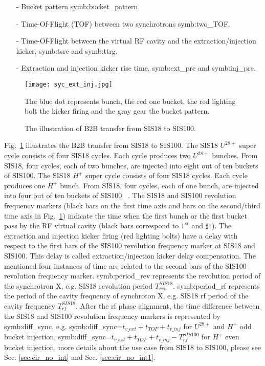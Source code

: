 \begin{itemize}
\item[-] Bucket pattern \gls{symb:bucket_pattern}.
\item[-] Time-Of-Flight (\gls{TOF}) between two synchrotrons \gls{symb:two_TOF}. 
\item[-] Time-Of-Flight between the virtual RF cavity and the extraction/injection kicker, \gls{symb:tsrc} and \gls{symb:ttrg}. 
\item[-] Extraction and injection kicker rise time, \gls{symb:ext_pre} and \gls{symb:inj_pre}.
\end{itemize}
\begin{figure}[H]
   \centering   
   \texttt{[image: syc\_ext\_inj.jpg]}
   \caption{The illustration of B2B transfer from SIS18 to SIS100.}{The blue dot represents bunch, the red one bucket, the red lighting bolt the kicker firing and the gray gear the bucket pattern.}
   \label{ext_inj_kicker}
\end{figure}
Fig.~\ref{ext_inj_kicker} illustrates the B2B transfer from SIS18 to SIS100. The SIS18 $U^{28+}$ super cycle consists of four SIS18 cycles. Each cycle produces two $U^{28+}$ bunches. From SIS18, four cycles, each of two bunches, are injected into eight out of ten buckets of SIS100. The SIS18 $H^{+}$ super cycle consists of four SIS18 cycles. Each cycle produces one $H^{+}$ bunch. From SIS18, four cycles, each of one bunch, are injected into four out of ten buckets of SIS100 ~\cite{liebermann_fair_2013, liebermann_sis100_2013}. The SIS18 and SIS100 revolution frequency markers (black bars on the first time axis and bars on the second/third time axis in Fig.~\ref{ext_inj_kicker}) indicate the time when the first bunch or the first bucket pass by the RF virtual cavity (black bars correspond to $1^{st}$ and $\sharp1$). The extraction and injection kicker firing (red lighting bolts) have a delay with respect to the first bars of the SIS100 revolution frequency marker at SIS18 and SIS100. This delay is called extraction/injection kicker delay compensation. The mentioned four instances of time are related to the second bars of the SIS100 revolution frequency marker. \gls{symb:period_rev} represents the revolution period of the synchrotron X, e.g. SIS18 revolution period $T_{\mathit{rev}}^{\mathit{SIS18}}$. \gls{symb:period_rf} represents the period of the cavity frequency of synchroton X, e.g. SIS18 rf period of the cavity frequency $T_{\mathit{rf}}^{\mathit{SIS18}}$. After the rf phase alignment, the time difference between the SIS18 and SIS100 revolution frequency markers is represented by \gls{symb:diff_sync}, e.g. \gls{symb:diff_sync}=$t_{\mathit{v\_ext}}+t_{\mathit{TOF}}+t_{\mathit{v\_inj}}$ for $U^{28+}$ and $H^{+}$ odd bucket injection,  \gls{symb:diff_sync}=$t_{\mathit{v\_ext}}+t_{\mathit{TOF}}+t_{\mathit{v\_inj}}- T_{\mathit{rf}}^{\mathit{SIS100}}$ for $H^{+}$ even bucket injection, more details about the use case from SIS18 to SIS100, please see Sec. \ref{sec:cir_no_int} and Sec.  \ref{sec:cir_no_int1}.
